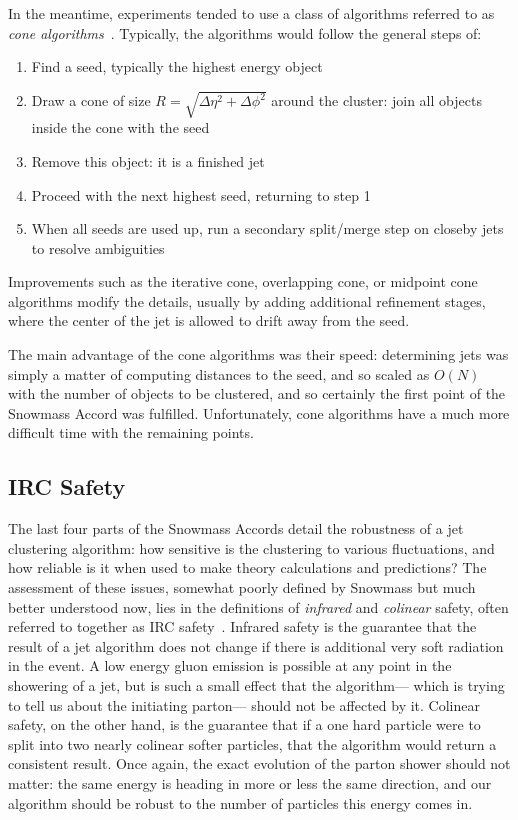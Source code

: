 In the meantime, experiments tended to use a class of algorithms referred to as \textit{cone algorithms}~\cite{Jetography}. Typically, the algorithms would follow the general steps of:
%
\begin{enumerate}
\item Find a seed, typically the highest energy object
\item Draw a cone of size $R = \sqrt{\Delta \eta^2 + \Delta \phi^2}$ around the cluster: join all objects inside the cone with the seed
\item Remove this object: it is a finished jet
\item Proceed with the next highest seed, returning to step 1
\item When all seeds are used up, run a secondary split/merge step on closeby jets to resolve ambiguities
\end{enumerate}
%
Improvements such as the iterative cone,  overlapping cone, or midpoint cone algorithms modify the details, usually by adding additional refinement stages, where the center of the jet is allowed to drift away from the seed.

The main advantage of the cone algorithms was their speed: determining jets was simply a matter of computing distances to the seed, and so scaled as $O(N)$ with the number of objects to be clustered, and so certainly the first point of the Snowmass Accord was fulfilled. Unfortunately, cone algorithms have a much more difficult time with the remaining points.

\subsection{IRC Safety}

The last four parts of the Snowmass Accords detail the robustness of a jet clustering algorithm: how sensitive is the clustering to various fluctuations, and how reliable is it when used to make theory calculations and predictions? The assessment of these issues, somewhat poorly defined by Snowmass but much better understood now, lies in the definitions of \textit{infrared} and \textit{colinear} safety, often referred to together as IRC safety~\cite{Jetography}. Infrared safety is the guarantee that the result of a jet algorithm does not change if there is additional very soft radiation in the event. A low energy gluon emission is possible at any point in the showering of a jet, but is such a small effect that the algorithm--- which is trying to tell us about the initiating parton--- should not be affected by it. Colinear safety, on the other hand, is the guarantee that if a one hard particle were to split into two nearly colinear softer particles, that the algorithm would return a consistent result. Once again, the exact evolution of the parton shower should not matter: the same energy is heading in more or less the same direction, and our algorithm should be robust to the number of particles this energy comes in.

